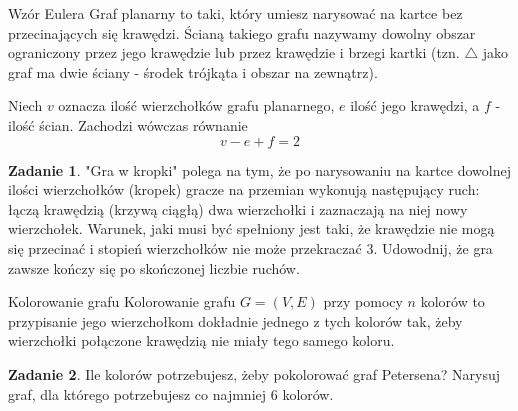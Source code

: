 \documentclass{uoom}
\theoremstyle{definition}
\newtheorem{zadd}{Zadanie}
\newenvironment{zadanie}{
  \begin{zadd}
  }
  {
    \end{zadd}\vspace{\ooodstep}
  }
\begin{document}
\begin{mybox}{Wzór Eulera}
  Graf planarny to taki, który umiesz narysować na kartce bez przecinających się krawędzi. Ścianą takiego grafu nazywamy dowolny obszar ograniczony przez jego krawędzie  lub przez krawędzie i brzegi kartki (tzn. $\triangle$ jako graf ma dwie ściany - środek trójkąta i obszar na zewnątrz). 

  Niech $v$ oznacza ilość wierzchołków grafu planarnego, $e$ ilość jego krawędzi, a $f$ - ilość ścian. Zachodzi wówczas równanie
  $$v-e+f=2$$
\end{mybox}

\begin{zadanie}
  "Gra w kropki" polega na tym, że po narysowaniu na kartce dowolnej ilości wierzchołków (kropek) gracze na przemian wykonują następujący ruch: łączą krawędzią (krzywą ciągłą) dwa wierzchołki i zaznaczają na niej nowy wierzchołek. Warunek, jaki musi być spełniony jest taki, że krawędzie nie mogą się przecinać i stopień wierzchołków nie może przekraczać $3$. Udowodnij, że gra zawsze kończy się po skończonej liczbie ruchów.
\end{zadanie}

\begin{mybox}{Kolorowanie grafu}
  Kolorowanie grafu $G=(V, E)$ przy pomocy $n$ kolorów to przypisanie jego wierzchołkom dokładnie jednego z tych kolorów tak, żeby wierzchołki połączone krawędzią nie miały tego samego koloru.
\end{mybox}

\begin{zadanie}
  Ile kolorów potrzebujesz, żeby pokolorować graf Petersena? Narysuj graf, dla którego potrzebujesz co najmniej $6$ kolorów.
\end{zadanie}
\end{document}
